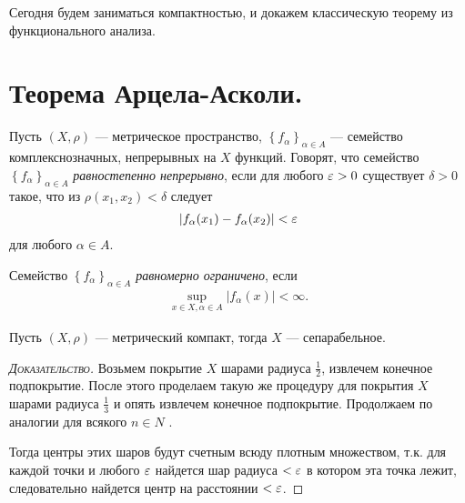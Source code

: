 \documentclass[../complex-analysis.tex]{subfiles}
\begin{document}
 Сегодня будем заниматься компактностью, и докажем классическую теорему из функционального анализа.

 \newpage
 \section{Теорема Арцела-Асколи.}

 \begin{df}
  Пусть $ (X,\rho) $ --- метрическое пространство, $ \left\{f_\alpha\right\}_{\alpha \in A}  $ --- семейство комплекснозначных, непрерывных на $ X $ функций. Говорят, что семейство $ \left\{f_\alpha\right\}_{\alpha\in A}  $ \textit{равностепенно непрерывно}, если для любого $ \varepsilon > 0 $ существует $ \delta > 0 $ такое, что из $ \rho(x_1, x_2) < \delta $ следует
  \begin{align}
	  \left|f_\alpha(x_1) - f_\alpha(x_2) \right| < \varepsilon \label{eq:equicontinuity}
  \end{align} для любого $ \alpha \in A $.
 \end{df}
 \begin{df}
  Семейство $ \left\{f_\alpha\right\}_{\alpha \in A}  $ \textit{равномерно ограничено}, если
  \begin{align*}
   \sup_{x \in X, \alpha \in A} \left| f_\alpha(x) \right| < \infty.
  \end{align*}
 \end{df}

 \begin{lm}
 	Пусть $(X, \rho)$ --- метрический компакт, тогда $X$ --- сепарабельное.
 \end{lm}

 \begin{proof}[\normalfont\textsc{Доказательство}]
	 Возьмем покрытие $X$ шарами радиуса $\frac{1}{2}$, извлечем конечное подпокрытие.
	 После этого проделаем такую же процедуру для покрытия $X$ шарами радиуса $\frac{1}{3}$  и опять извлечем конечное подпокрытие.
	 Продолжаем по аналогии для всякого $n \in N$ .

	 Тогда центры этих шаров будут счетным всюду плотным множеством, т.к. для каждой точки и любого $\varepsilon$ найдется шар радиуса $< \varepsilon$ в котором эта точка лежит, следовательно найдется центр на расстоянии $< \varepsilon$. 
 \end{proof}
\end{document}
